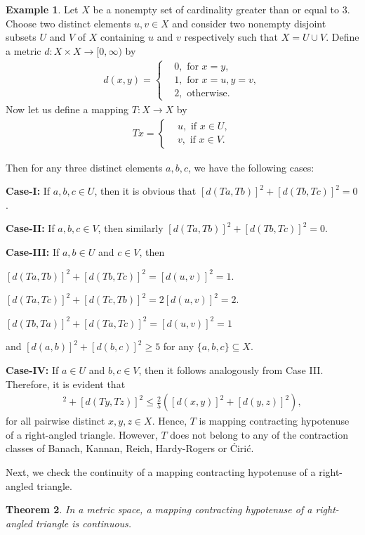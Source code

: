 \documentclass[11pt,reqno,a4paper]{amsart}
\theoremstyle{plain}
\newtheorem{theorem}{Theorem}[section]
\theoremstyle{definition}
\newtheorem{example}[theorem]{Example}
\theoremstyle{remark}
\numberwithin{equation}{section}
\begin{document}
\begin{example}\label{23}
Let $X$ be a nonempty set of cardinality greater than or equal to $3$. Choose two distinct elements $u,v \in X$ and consider two nonempty disjoint subsets $U$ and $V$ of $X$ containing $u$ and $v$ respectively such that $X=U \cup V$. Define a metric $d:X \times X \to [0,\infty)$ by
\begin{align*}
    d(x,y)=
    \begin{cases}
        &0, \text{ for }x=y,\\
        &1, \text{ for }x=u,y=v,\\
        &2, \text{ otherwise}.
    \end{cases}
\end{align*}
 Now let us define a mapping $T:X \to X$ by
\begin{align*}
    Tx=
    \begin{cases}
        &u, \text{ if }x \in U,\\
        &v, \text{ if }x \in V.
    \end{cases}
\end{align*}
 
Then for any three distinct elements $a,b,c$, we have the following cases:

\medskip
\noindent
\textbf{Case-I:} If $a,b,c \in U$, then it is obvious that $[d(Ta,Tb)]^2 + [d(Tb,Tc)]^2=0$.

\smallskip
\noindent
\textbf{Case-II:} If $a,b,c \in V$, then similarly $[d(Ta,Tb)]^2 + [d(Tb,Tc)]^2=0$.

\smallskip
\noindent
\textbf{Case-III:} If $a,b \in U$ and $c \in V$, then

\smallskip
$[d(Ta,Tb)]^2 + [d(Tb,Tc)]^2=[d(u,v)]^2=1$.

\smallskip
$[d(Ta,Tc)]^2 + [d(Tc,Tb)]^2=2[d(u,v)]^2=2$.

\smallskip
$[d(Tb,Ta)]^2 + [d(Ta,Tc)]^2=[d(u,v)]^2=1$ 

\smallskip
and  $[d(a,b)]^2 + [d(b,c)]^2 \geq 5$ for any $\{a,b,c\} \subseteq X$.

\smallskip
\noindent
\textbf{Case-IV:} If $a\in U$ and $b,c \in V$, then it follows analogously from Case III.\\
Therefore, it is evident that 
\begin{align*}
    [d(Tx,Ty)]^2+[d(Ty,Tz)]^2\le \frac{2}{5} ([d(x,y)]^2+[d(y,z)]^2), 
\end{align*}
for all pairwise distinct $x,y,z \in X$. Hence, $T$ is mapping contracting hypotenuse of a right-angled triangle. However, $T$ does not belong to any of the contraction classes of Banach, Kannan, Reich, Hardy-Rogers or \'Ciri\'c. 
\end{example}
Next, we check the continuity of a mapping contracting hypotenuse of a right-angled triangle.
\begin{theorem}\label{24}
In a metric space, a mapping contracting hypotenuse of a right-angled triangle is continuous. 
\end{theorem}
\end{document}
